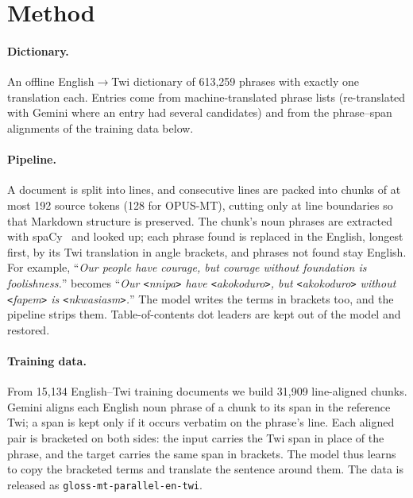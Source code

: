 \documentclass[10pt,twocolumn]{article}
\newcommand{\term}[1]{\texttt{<}#1\texttt{>}}
\begin{document}
\section{Method}

\paragraph{Dictionary.} An offline English$\rightarrow$Twi dictionary of 613,259 phrases with exactly one translation each. Entries come from machine-translated phrase lists (re-translated with Gemini where an entry had several candidates) and from the phrase--span alignments of the training data below.

\paragraph{Pipeline.} A document is split into lines, and consecutive lines are packed into chunks of at most 192 source tokens (128 for OPUS-MT), cutting only at line boundaries so that Markdown structure is preserved. The chunk's noun phrases are extracted with spaCy~\cite{honnibal2020spacy} and looked up; each phrase found is replaced in the English, longest first, by its Twi translation in angle brackets, and phrases not found stay English. For example, ``\emph{Our people have courage, but courage without foundation is foolishness.}'' becomes ``\emph{Our \term{nnipa} have \term{akokoduro}, but \term{akokoduro} without \term{fapem} is \term{nkwasias{\textepsilon}m}.}'' The model writes the terms in brackets too, and the pipeline strips them. Table-of-contents dot leaders are kept out of the model and restored.

\paragraph{Training data.} From 15,134 English--Twi training documents we build 31,909 line-aligned chunks. Gemini aligns each English noun phrase of a chunk to its span in the reference Twi; a span is kept only if it occurs verbatim on the phrase's line. Each aligned pair is bracketed on both sides: the input carries the Twi span in place of the phrase, and the target carries the same span in brackets. The model thus learns to copy the bracketed terms and translate the sentence around them. The data is released as \texttt{gloss-mt-parallel-en-twi}.
\end{document}
